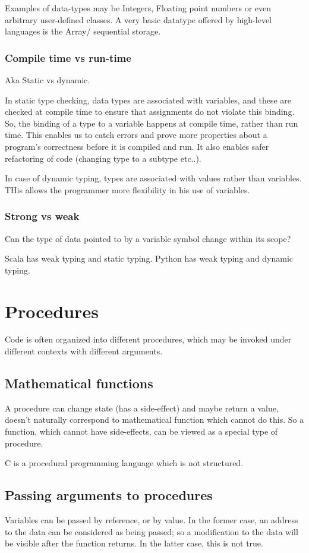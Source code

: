 \documentclass[oneside, article]{memoir}
\begin{document}
Examples of data-types may be Integers, Floating point numbers or even arbitrary user-defined classes. A very basic datatype offered by high-level languages is the Array/ sequential storage.

\subsubsection{Compile time vs run-time}
Aka Static vs dynamic.

In static type checking, data types are associated with variables, and these are checked at compile time to ensure that assignments do not violate this binding. So, the binding of a type to a variable happens at compile time, rather than run time. This enables us to catch errors and prove more properties about a program's correctness before it is compiled and run. It also enables safer refactoring of code (changing type to a subtype etc..).

In case of dynamic typing, types are associated with values rather than variables. THis allows the programmer more flexibility in his use of variables.

\subsubsection{Strong vs weak}
Can the type of data pointed to by a variable symbol change within its scope?

Scala has weak typing and static typing. Python has weak typing and dynamic typing.



\section{Procedures}
Code is often organized into different procedures, which may be invoked under different contexts with different arguments.

\subsection{Mathematical functions}
A procedure can change state (has a side-effect) and maybe return a value, doesn't naturally correspond to mathematical function which cannot do this. So a function, which cannot have side-effects, can be viewed as a special type of procedure.

C is a procedural programming language which is not structured.

\subsection{Passing arguments to procedures}
Variables can be passed by reference, or by value. In the former case, an address to the data can be considered as being passed; so a modification to the data will be visible after the function returns. In the latter case, this is not true.
\end{document}
